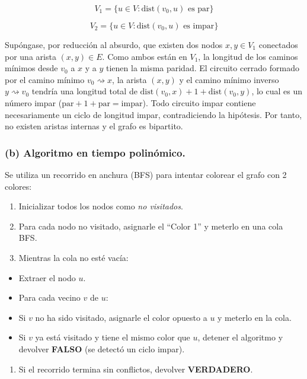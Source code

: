 \documentclass[12pt]{book} %
\providecommand{\tightlist}{%
  \setlength{\itemsep}{0pt}\setlength{\parskip}{0pt}}
\begin{document}
\[V_1 = \{u \in V : \text{dist}(v_0, u) \text{ es par}\}\]

\[V_2 = \{u \in V : \text{dist}(v_0, u) \text{ es impar}\}\]

Supóngase, por reducción al absurdo, que existen dos nodos
\(x, y \in V_1\) conectados por una arista \((x,y) \in E\). Como ambos
están en \(V_1\), la longitud de los caminos mínimos desde \(v_0\) a
\(x\) y a \(y\) tienen la misma paridad. El circuito cerrado formado por
el camino mínimo \(v_0 \rightsquigarrow x\), la arista \((x, y)\) y el
camino mínimo inverso \(y \rightsquigarrow v_0\) tendría una longitud
total de \(\text{dist}(v_0, x) + 1 + \text{dist}(v_0, y)\), lo cual es
un número impar (\(\text{par} + 1 + \text{par} = \text{impar}\)). Todo
circuito impar contiene necesariamente un ciclo de longitud impar,
contradiciendo la hipótesis. Por tanto, no existen aristas internas y el
grafo es bipartito.

\hypertarget{b-algoritmo-en-tiempo-polinuxf3mico.}{%
\subsubsection{(b) Algoritmo en tiempo
polinómico.}\label{b-algoritmo-en-tiempo-polinuxf3mico.}}

Se utiliza un recorrido en anchura (BFS) para intentar colorear el grafo
con 2 colores:

\begin{enumerate}
\def\labelenumi{\arabic{enumi}.}
\tightlist
\item
  Inicializar todos los nodos como \emph{no visitados}.
\item
  Para cada nodo no visitado, asignarle el ``Color 1'' y meterlo en una
  cola BFS.
\item
  Mientras la cola no esté vacía:
\end{enumerate}

\begin{itemize}
\tightlist
\item
  Extraer el nodo \(u\).
\item
  Para cada vecino \(v\) de \(u\):
\item
  Si \(v\) no ha sido visitado, asignarle el color opuesto a \(u\) y
  meterlo en la cola.
\item
  Si \(v\) ya está visitado y tiene el mismo color que \(u\), detener el
  algoritmo y devolver \textbf{FALSO} (se detectó un ciclo impar).
\end{itemize}

\begin{enumerate}
\def\labelenumi{\arabic{enumi}.}
\setcounter{enumi}{3}
\tightlist
\item
  Si el recorrido termina sin conflictos, devolver \textbf{VERDADERO}.
\end{enumerate}
\end{document}
